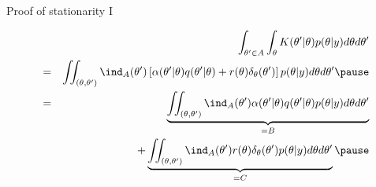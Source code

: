 \begin{frame}{Proof of stationarity I}


\begin{eqnarray*}
&& \int_{\theta' \in A}\int_{\theta} K(\theta' | \theta) p(\theta|y) d\theta d\theta'\\
&=& \iint_{(\theta,\theta') }\ind_{A}(\theta') \left[  \alpha(\theta' | \theta) q(\theta'|\theta)  + r(\theta) \delta_{\theta}(\theta')\right] p(\theta| y) d\theta d\theta'\pause\\
&=& \underbrace{\iint_{(\theta,\theta') }\ind_{A}(\theta')   \alpha(\theta' | \theta) q(\theta'|\theta) p(\theta| y) d\theta d\theta'}_{=B} \\
&& + \underbrace{\iint_{(\theta,\theta')}\ind_{A}(\theta') r(\theta) \delta_{\theta}(\theta') p(\theta| y) d\theta d\theta'}_{=C}\pause\\
\end{eqnarray*}
\end{frame}

